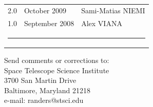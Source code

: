 \begin{titlepage}
\begin{table}[h]
\begin{tabular}{lll}
      2.0                 &  October 2009  & Sami-Matias NIEMI  \\ 
      1.0                 &  September 2008  & Alex VIANA  \\ 
 
 
 \multicolumn{3}{c}{ \rule{130mm}{0.8mm}}      \\    
\end{tabular}
\end{table}%


\vspace{120mm}

\begin{flushright}
Send comments or corrections to: \\
Space Telescope Science Institute \\
3700 San Martin Drive \\
Baltimore, Maryland 21218 \\
e-mail: randers@stsci.edu
 \end{flushright}
\end{titlepage}